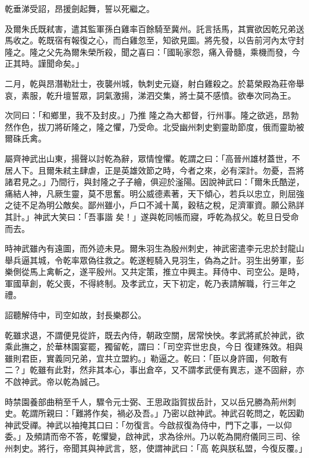 \begin{pinyinscope}
 乾垂涕受詔，昂援劍起舞，誓以死繼之。



 及爾朱氏既弒害，遣其監軍孫白雞率百餘騎至冀州。託言括馬，其實欲因乾兄弟送馬收之。乾既宿有報復之心，而白雞忽至，知欲見圖。將先發，以告前河內太守封隆之。隆之父先為爾朱榮所殺，聞之喜曰：「國恥家怨，痛入骨髓，乘機而發，今正其時。謹聞命矣。」



 二月，乾與昂潛勒壯士，夜襲州城，執刺史元嶷，射白雞殺之。於葛榮殿為莊帝舉哀，素服，乾升壇誓眾，詞氣激揚，涕泗交集，將士莫不感憤。欲奉次同為王。



 次同曰：「和鄉里，我不及封皮。」乃推
 隆之為大都督，行州事。隆之欲逃，昂勃然作色，拔刀將斫隆之，隆之懼，乃受命。北受幽州刺史劉靈助節度，俄而靈助被爾硃氏禽。



 屬齊神武出山東，揚聲以討乾為辭，眾情惶懼。乾謂之曰：「高晉州雄材蓋世，不居人下。且爾朱弒主肆虐，正是英雄效節之時，今者之來，必有深計。勿憂，吾將諸君見之。」乃間行，與封隆之子子繪，俱迎於滏陽。因說神武曰：「爾朱氏酷逆，痛結人神，凡厥生靈，莫不思奮。明公威德素著，天下傾心，若兵以忠立，則屈強之徒不足為明公敵矣。鄙州雖小，戶口不減十萬，穀秸之稅，足濟軍資。願公熟詳其計。」神武大笑曰：「吾事諧
 矣！」遂與乾同帳而寢，呼乾為叔父。乾旦日受命而去。



 時神武雖內有遠圖，而外迹未見。爾朱羽生為殷州刺史，神武密遣李元忠於封龍山舉兵逼其城，令乾率眾偽往救之。乾遂輕騎入見羽生，偽為之計。羽生出勞軍，彭樂側從馬上禽斬之，遂平殷州。又共定策，推立中興主。拜侍中、司空公。是時，軍國草創，乾父喪，不得終制。及孝武立，天下初定，乾乃表請解職，行三年之禮。



 詔聽解侍中，司空如故，封長樂郡公。



 乾雖求退，不謂便見從許，既去內侍，朝政空關，居常怏怏。孝武將貳於神武，欲乘此撫之，於華林園宴罷，獨留乾，謂曰：「司空弈世忠良，今日
 復建殊效。相與雖則君臣，實義同兄弟，宜共立盟約。」勒逼之。乾曰：「臣以身許國，何敢有二？」乾雖有此對，然非其本心，事出倉卒，又不謂孝武便有異志，遂不固辭，亦不啟神武。帝以乾為誠己。



 時禁園養部曲稍至千人，驟令元士弼、王思政詣賀拔岳計，又以岳兄勝為荊州刺史。乾謂所親曰：「難將作矣，禍必及吾。」乃密以啟神武。神武召乾問之，乾因勸神武受禪。神武以袖掩其口曰：「勿復言。今啟叔復為侍中，門下之事，一以仰委。」及頻請而帝不答，乾懼變，啟神武，求為徐州。乃以乾為開府儀同三司、徐州刺史。將行，帝聞其與神武言，怒，使謂神武曰：「高
 乾與朕私盟，今復反覆。」




\end{pinyinscope}
